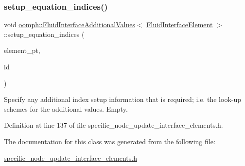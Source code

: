 \subsubsection{\texorpdfstring{setup\+\_\+equation\+\_\+indices()}{setup\_equation\_indices()}}
{\footnotesize\ttfamily void \hyperlink{classoomph_1_1FluidInterfaceAdditionalValues}{oomph\+::\+Fluid\+Interface\+Additional\+Values}$<$ \hyperlink{classoomph_1_1FluidInterfaceElement}{Fluid\+Interface\+Element} $>$\+::setup\+\_\+equation\+\_\+indices (\begin{DoxyParamCaption}\item[{\hyperlink{classoomph_1_1FluidInterfaceElement}{Fluid\+Interface\+Element} $\ast$const \&}]{element\+\_\+pt,  }\item[{const unsigned \&}]{id }\end{DoxyParamCaption})\hspace{0.3cm}{\ttfamily [inline]}}



Specify any additional index setup information that is required; i.\+e. the look-\/up schemes for the additional values. Empty. 



Definition at line 137 of file specific\+\_\+node\+\_\+update\+\_\+interface\+\_\+elements.\+h.



The documentation for this class was generated from the following file\+:\begin{DoxyCompactItemize}
\item 
\hyperlink{specific__node__update__interface__elements_8h}{specific\+\_\+node\+\_\+update\+\_\+interface\+\_\+elements.\+h}\end{DoxyCompactItemize}
